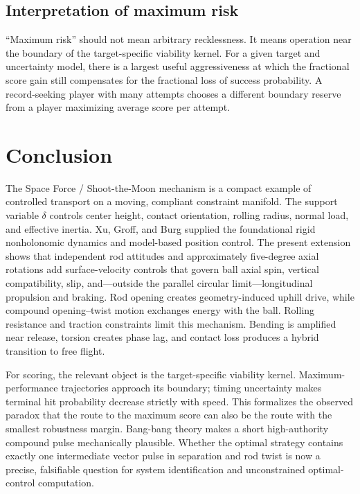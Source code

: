 \documentclass[11pt]{article}
\numberwithin{equation}{section}
\theoremstyle{definition}
\theoremstyle{remark}
\begin{document}
\subsection{Interpretation of maximum risk}

``Maximum risk'' should not mean arbitrary recklessness.  It means operation near the boundary of the target-specific viability kernel.  For a given target and uncertainty model, there is a largest useful aggressiveness at which the fractional score gain still compensates for the fractional loss of success probability.  A record-seeking player with many attempts chooses a different boundary reserve from a player maximizing average score per attempt.

\section{Conclusion}

The Space Force / Shoot-the-Moon mechanism is a compact example of controlled transport on a moving, compliant constraint manifold.  The support variable $\delta$ controls center height, contact orientation, rolling radius, normal load, and effective inertia.  Xu, Groff, and Burg supplied the foundational rigid nonholonomic dynamics and model-based position control.  The present extension shows that independent rod attitudes and approximately five-degree axial rotations add surface-velocity controls that govern ball axial spin, vertical compatibility, slip, and---outside the parallel circular limit---longitudinal propulsion and braking.  Rod opening creates geometry-induced uphill drive, while compound opening--twist motion exchanges energy with the ball.  Rolling resistance and traction constraints limit this mechanism.  Bending is amplified near release, torsion creates phase lag, and contact loss produces a hybrid transition to free flight.

For scoring, the relevant object is the target-specific viability kernel.  Maximum-performance trajectories approach its boundary; timing uncertainty makes terminal hit probability decrease strictly with speed.  This formalizes the observed paradox that the route to the maximum score can also be the route with the smallest robustness margin.  Bang-bang theory makes a short high-authority compound pulse mechanically plausible.  Whether the optimal strategy contains exactly one intermediate vector pulse in separation and rod twist is now a precise, falsifiable question for system identification and unconstrained optimal-control computation.
\end{document}
